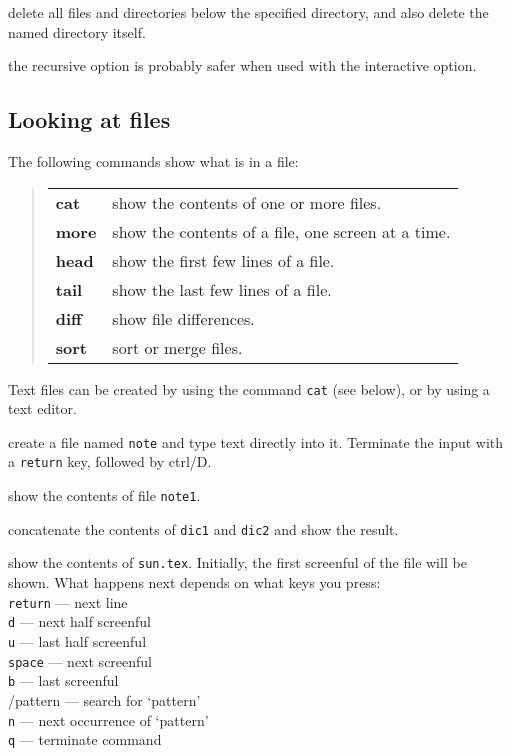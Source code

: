 {delete all files and directories below the specified directory, and also
delete the named directory itself.}

{the recursive option is probably safer when used with the interactive option.}

\exend

\subsection{Looking at files}

The following commands show what is in a file:

\begin{quote}
\begin{tabular}{lp{74mm}}

{\bf cat}  & show the contents of one or more files.\\
{\bf more} & show the contents of a file, one screen at a time.\\
{\bf head} & show the first few lines of a file.\\
{\bf tail} & show the last few lines of a file.\\
{\bf diff} & show file differences.\\
{\bf sort} & sort or merge files.

\end{tabular}
\end{quote}

Text files can be created by using the command {\tt cat} (see below), or by
using a text editor.

\goodbreak

\exbegin

{create a file named {\tt note} and type text directly into it.
Terminate the input with a {\tt return}  key, followed by ctrl/D.}

{show the contents of file {\tt note1}.}

{concatenate the contents of {\tt dic1} and {\tt dic2} and show the result.}

{show the contents of {\tt sun.tex}.
Initially, the first screenful of the file will be shown.
What happens next depends on what keys you press:\\
{\tt return}  --- next line\\
{\tt d} --- next half screenful\\
{\tt u} --- last half screenful\\
{\tt space} --- next screenful\\
{\tt b} --- last screenful\\
/pattern --- search for `pattern'\\
{\tt n} --- next occurrence of `pattern'\\
{\tt q} --- terminate command}

